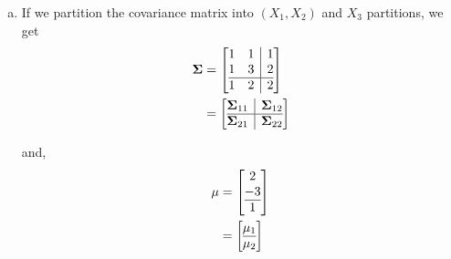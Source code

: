 \documentclass[12pt]{article}\usepackage[]{graphicx}\usepackage[]{color}
\newcommand{\vct}{\mathbf}
\begin{document}
\begin{enumerate}[a)]
\item If we partition the covariance matrix into $(X_1, X_2)$ and $X_3$ partitions, we get
\begin{align*}
\vct{\Sigma} &= \left[\begin{array}{@{}cc|c@{}}
    1 & 1 & 1 \\
    1 & 3 & 2 \\\hline
    1 & 2 & 2
  \end{array}\right]\\
&=\left[\begin{array}{@{}c|c@{}}
    \vct{\Sigma}_{11} & \vct{\Sigma}_{12} \\\hline
    \vct{\Sigma}_{21} & \vct{\Sigma}_{22}
  \end{array}\right]
\end{align*}

and,
\begin{align*}
\vct{\mu} &= \left[\begin{array}{@{}c@{}}
    2 \\
    -3 \\\hline
    1
  \end{array}\right]\\
&= \left[\begin{array}{@{}c@{}}
    \vct{\mu}_1 \\\hline
    \vct{\mu}_2
  \end{array}\right]
\end{align*}



\end{enumerate}
\end{document}

